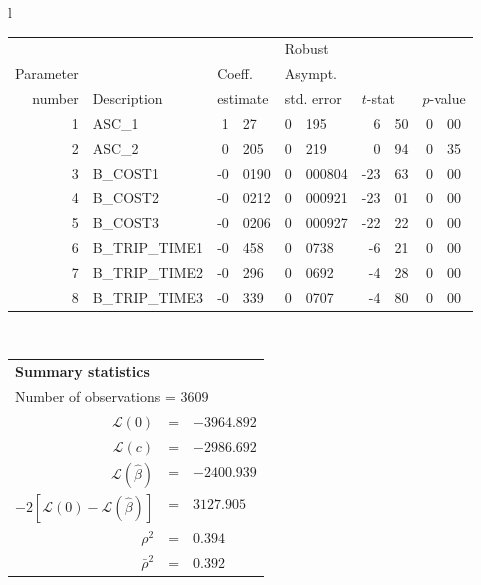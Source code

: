   \begin{tabular}{l}
\begin{tabular}{rlr@{.}lr@{.}lr@{.}lr@{.}l}
         &                       &   \multicolumn{2}{l}{}    & \multicolumn{2}{l}{Robust}  &     \multicolumn{4}{l}{}   \\
Parameter &                       &   \multicolumn{2}{l}{Coeff.}      & \multicolumn{2}{l}{Asympt.}  &     \multicolumn{4}{l}{}   \\
number &  Description                     &   \multicolumn{2}{l}{estimate}      & \multicolumn{2}{l}{std. error}  &   \multicolumn{2}{l}{$t$-stat}  &   \multicolumn{2}{l}{$p$-value}   \\

\hline

1 & ASC\_1 & 1&27 & 0&195 & 6&50 & 0&00 \\
2 & ASC\_2 & 0&205 & 0&219 & 0&94 & 0&35 \\
3 & B\_COST1 & -0&0190 & 0&000804 & -23&63 & 0&00 \\
4 & B\_COST2 & -0&0212 & 0&000921 & -23&01 & 0&00 \\
5 & B\_COST3 & -0&0206 & 0&000927 & -22&22 & 0&00 \\
6 & B\_TRIP\_TIME1 & -0&458 & 0&0738 & -6&21 & 0&00 \\
7 & B\_TRIP\_TIME2 & -0&296 & 0&0692 & -4&28 & 0&00 \\
8 & B\_TRIP\_TIME3 & -0&339 & 0&0707 & -4&80 & 0&00 \\
\hline

\end{tabular}
\\
\begin{tabular}{rcl}
\multicolumn{3}{l}{\bf Summary statistics}\\
\multicolumn{3}{l}{ Number of observations = $3609$} \\
 $\mathcal{L}(0)$ &=&  $-3964.892$ \\
 $\mathcal{L}(c)$ &=& $-2986.692$\\
 $\mathcal{L}(\hat{\beta})$ &=& $-2400.939 $  \\
 $-2[\mathcal{L}(0) -\mathcal{L}(\hat{\beta})]$ &=& $3127.905$ \\
    $\rho^2$ &=&   $0.394$ \\
    $\bar{\rho}^2$ &=&    $0.392$ \\
\end{tabular}
\end{tabular}

